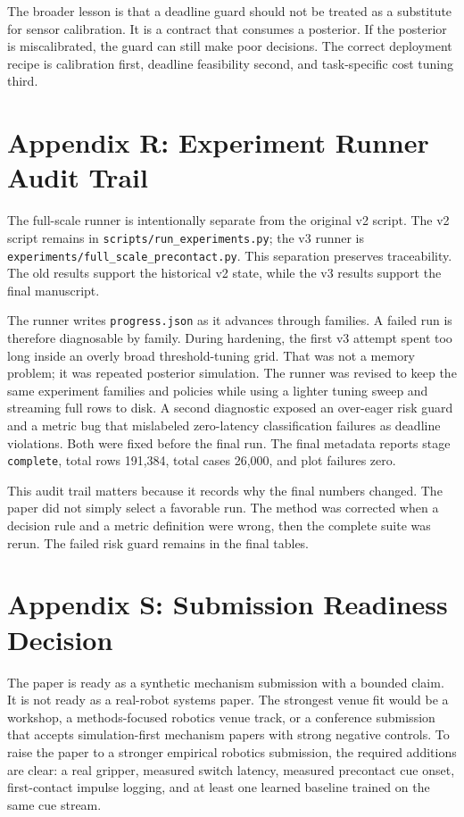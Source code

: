\documentclass{article}
\begin{document}
The broader lesson is that a deadline guard should not be treated as a substitute for sensor calibration. It is a contract that consumes a posterior. If the posterior is miscalibrated, the guard can still make poor decisions. The correct deployment recipe is calibration first, deadline feasibility second, and task-specific cost tuning third.

\section{Appendix R: Experiment Runner Audit Trail}

The full-scale runner is intentionally separate from the original v2 script. The v2 script remains in \texttt{scripts/run\_experiments.py}; the v3 runner is \texttt{experiments/full\_scale\_precontact.py}. This separation preserves traceability. The old results support the historical v2 state, while the v3 results support the final manuscript.

The runner writes \texttt{progress.json} as it advances through families. A failed run is therefore diagnosable by family. During hardening, the first v3 attempt spent too long inside an overly broad threshold-tuning grid. That was not a memory problem; it was repeated posterior simulation. The runner was revised to keep the same experiment families and policies while using a lighter tuning sweep and streaming full rows to disk. A second diagnostic exposed an over-eager risk guard and a metric bug that mislabeled zero-latency classification failures as deadline violations. Both were fixed before the final run. The final metadata reports stage \texttt{complete}, total rows 191,384, total cases 26,000, and plot failures zero.

This audit trail matters because it records why the final numbers changed. The paper did not simply select a favorable run. The method was corrected when a decision rule and a metric definition were wrong, then the complete suite was rerun. The failed risk guard remains in the final tables.

\section{Appendix S: Submission Readiness Decision}

The paper is ready as a synthetic mechanism submission with a bounded claim. It is not ready as a real-robot systems paper. The strongest venue fit would be a workshop, a methods-focused robotics venue track, or a conference submission that accepts simulation-first mechanism papers with strong negative controls. To raise the paper to a stronger empirical robotics submission, the required additions are clear: a real gripper, measured switch latency, measured precontact cue onset, first-contact impulse logging, and at least one learned baseline trained on the same cue stream.
\end{document}
